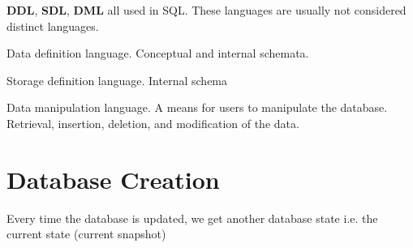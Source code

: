 \documentclass[12pt]{report}
\begin{document}
\begin{description}[style=multiline,leftmargin=12em]
		\item [DBMS Languages] \textbf{DDL}, \textbf{SDL}, \textbf{DML} all used in SQL. These languages are usually not considered distinct languages.
		\item [DDL] Data definition language. Conceptual and internal schemata.
		\item [SDL] Storage definition language. Internal schema
		\item [DML] Data manipulation language. A means for users to manipulate the database. Retrieval, insertion, deletion, and modification of the data.
		
		
		\item [Concurency Control]
	\end{description}
	\section{Database Creation}
	Every time the database is updated, we get another database state i.e. the current state (current snapshot)
	
	
\end{document}
